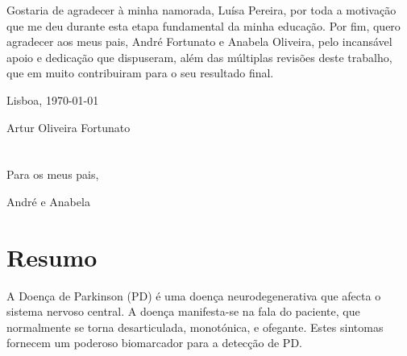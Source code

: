 Gostaria de agradecer à minha namorada, Luísa Pereira, por toda a motivação que me deu durante esta etapa fundamental da minha educação. Por fim, quero agradecer aos meus pais, André Fortunato e Anabela Oliveira, pelo incansável apoio e dedicação que dispuseram, além das múltiplas revisões deste trabalho, que em muito contribuiram para o seu resultado final.

\vfill
\begin{flushright}
  \begin{minipage}{8cm}
    \begin{center}
      Lisboa, \today

      Artur Oliveira Fortunato
    \end{center}
  \end{minipage}
\end{flushright}

\cleardoublepage


\chapter*{}
\thispagestyle{empty}

\vfill
\mbox{}
\vfill\Large
\begin{flushright}
  \begin{minipage}{8cm}
    \begin{center}
	Para os meus pais, 
	
	André e Anabela
    \end{center}
  \end{minipage}
\end{flushright}
\normalsize\vfill

\cleardoublepage


\chapter*{Resumo}
\thispagestyle{empty}

A Doença de Parkinson (PD) é uma doença neurodegenerativa que afecta o sistema nervoso central. A doença manifesta-se na fala do paciente, que normalmente se torna desarticulada, monotónica, e ofegante. Estes sintomas fornecem um poderoso biomarcador para a detecção de PD.

